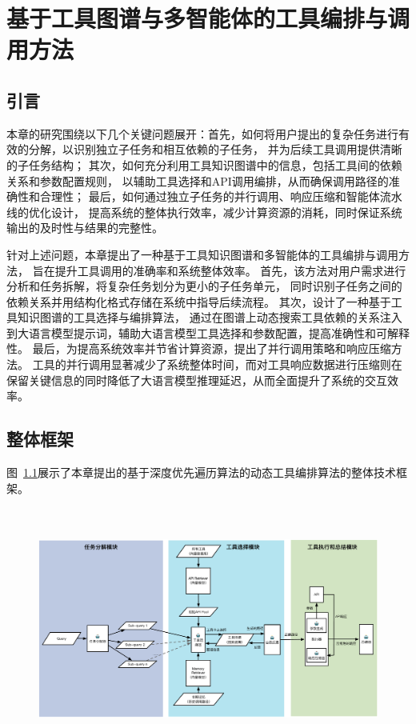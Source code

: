 \chapter{基于工具图谱与多智能体的工具编排与调用方法}

\section{引言}
\label{sec:intro}


本章的研究围绕以下几个关键问题展开：首先，如何将用户提出的复杂任务进行有效的分解，以识别独立子任务和相互依赖的子任务，
并为后续工具调用提供清晰的子任务结构；
其次，如何充分利用工具知识图谱中的信息，包括工具间的依赖关系和参数配置规则，
以辅助工具选择和API调用编排，从而确保调用路径的准确性和合理性；
最后，如何通过独立子任务的并行调用、响应压缩和智能体流水线的优化设计，
提高系统的整体执行效率，减少计算资源的消耗，同时保证系统输出的及时性与结果的完整性。

针对上述问题，本章提出了一种基于工具知识图谱和多智能体的工具编排与调用方法，
旨在提升工具调用的准确率和系统整体效率。
首先，该方法对用户需求进行分析和任务拆解，将复杂任务划分为更小的子任务单元，
同时识别子任务之间的依赖关系并用结构化格式存储在系统中指导后续流程。
其次，设计了一种基于工具知识图谱的工具选择与编排算法，
通过在图谱上动态搜索工具依赖的关系注入到大语言模型提示词，辅助大语言模型工具选择和参数配置，提高准确性和可解释性。
最后，为提高系统效率并节省计算资源，提出了并行调用策略和响应压缩方法。
工具的并行调用显著减少了系统整体时间，而对工具响应数据进行压缩则在保留关键信息的同时降低了大语言模型推理延迟，从而全面提升了系统的交互效率。

\section{整体框架}

图~\ref{fig:ch4-framework}展示了本章提出的基于深度优先遍历算法的动态工具编排算法的整体技术框架。

\begin{figure}[!htp]
  \vspace{1em}
  \centering
  \setlength{\abovecaptionskip}{10pt} %
  \includegraphics[height=8cm]{../assets/ch4-整体框架图-3.pdf}
  \label{fig:ch4-framework}
\end{figure}

